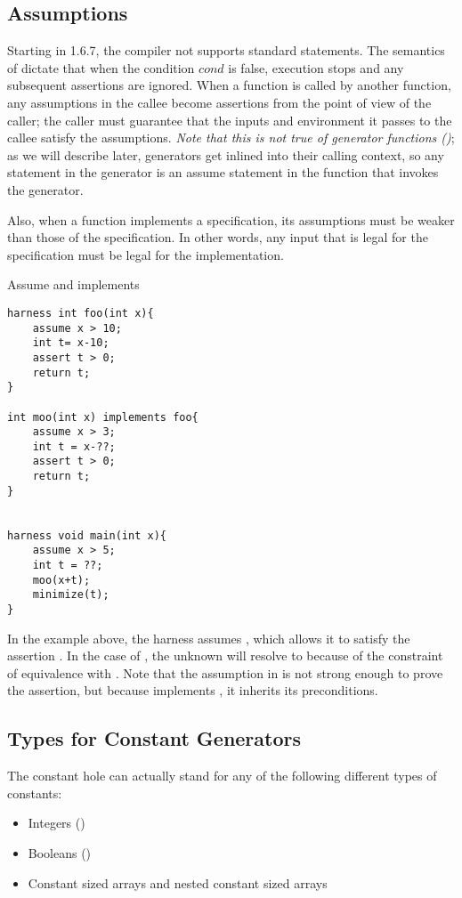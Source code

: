 \subsection{Assumptions}
Starting in \Sk{} 1.6.7, the compiler not supports standard  statements. The semantics of  dictate that when the condition $cond$ is false, execution stops and any subsequent assertions are ignored. When a function is called by another function, any assumptions in the callee become assertions from the point of view of the caller; \ie{} the caller must guarantee that the inputs and environment it passes to the callee satisfy the assumptions. \emph{Note that this is not true of generator functions ()}; as we will describe later, generators get inlined into their calling context, so any  statement in the generator is an assume statement in the function that invokes the generator.

Also, when a function implements a specification, its assumptions must be weaker than those of the specification. In other words, any input that is legal for the specification must be legal for the implementation. 

\begin{Example}{Assume and implements}
\begin{lstlisting}
harness int foo(int x){
	assume x > 10;
	int t= x-10;
	assert t > 0;
	return t;
}

int moo(int x) implements foo{
	assume x > 3;
	int t = x-??;
	assert t > 0;
	return t;
}


harness void main(int x){
	assume x > 5;
	int t = ??;
	moo(x+t);
	minimize(t);
}
\end{lstlisting}
In the example above, the harness  assumes , which allows it to satisfy the assertion . In the case of , the unknown will resolve to  because of the constraint of equivalence with . Note that the assumption in  is not strong enough to prove the assertion, but because  implements , it inherits its preconditions. 
\end{Example}


\subsection{Types for Constant Generators}
The constant hole  can actually stand for any of the following different types of constants: 
\begin{itemize}
	\item Integers ()
	\item Booleans ()
	\item Constant sized arrays and nested constant sized arrays
\end{itemize}

